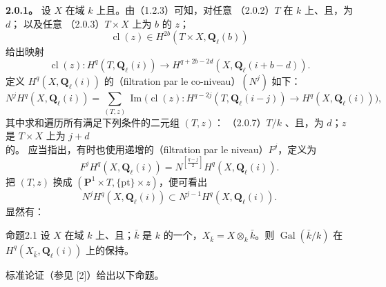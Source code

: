 \textbf{2.0.1。} 设 $X$ 在域 $k$ 上且。由（1.2.3）可知，对任意
\noindent（2.0.2）$T$ 在 $k$ 上、且，为 $d$；
以及任意
\noindent（2.0.3）$T\times X$ 上为 $b$ 的 $z$；
\begin{equation}\tag{2.0.4}
\operatorname{cl}(z)\in H^{2b}(T\times X,\mathbf Q_\ell(b))
\end{equation}
给出映射
\begin{equation}\tag{2.0.5}
\operatorname{cl}(z):H^q(T,\mathbf Q_\ell(i))\longrightarrow H^{q+2b-2d}(X,\mathbf Q_\ell(i+b-d)).
\end{equation}
定义 $H^q(X,\mathbf Q_\ell(i))$ 的（filtration par le co-niveau）$(N^j)$ 如下：
\begin{equation}\tag{2.0.6}
N^jH^q(X,\mathbf Q_\ell(i))=\sum_{(T,z)}\operatorname{Im}\bigl(\operatorname{cl}(z):H^{q-2j}(T,\mathbf Q_\ell(i-j))\longrightarrow H^q(X,\mathbf Q_\ell(i))\bigr),
\end{equation}
其中求和遍历所有满足下列条件的二元组 $(T,z)$：
\noindent（2.0.7）$T/k$ 、且，为 $d$；$z$ 是 $T\times X$ 上为 $j+d$ 的。
应当指出，有时也使用递增的（filtration par le niveau）$F^j$，定义为
\begin{equation}\tag{2.0.8}
F^jH^q(X,\mathbf Q_\ell(i))=N^{[\frac{q-j}{2}]}H^q(X,\mathbf Q_\ell(i)).
\end{equation}
把 $(T,z)$ 换成 $(\mathbf P^1\times T,\{\mathrm{pt}\}\times z)$，便可看出
\begin{equation}\tag{2.0.9}
N^jH^q(X,\mathbf Q_\ell(i))\subset N^{j-1}H^q(X,\mathbf Q_\ell(i)).
\end{equation}
显然有：
\begin{SGAresult}{命题}{2.1}
设 $X$ 在域 $k$ 上、且；$\bar k$ 是 $k$ 的一个，$X_{\bar k}=X\otimes_k\bar k$。则 $\operatorname{Gal}(\bar k/k)$ 在 $H^q(X_{\bar k},\mathbf Q_\ell(i))$ 上的保持。
\end{SGAresult}
标准论证（参见 [2]）给出以下命题。
